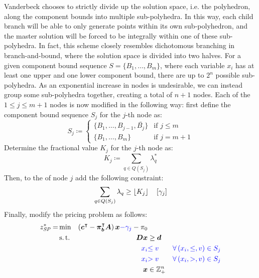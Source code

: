 Vanderbeck chooses to strictly divide up the solution space, i.e. the polyhedron, along the component bounds into multiple sub-polyhedra. In this way, each child branch will be able to only generate points within its own sub-polyhedron, and the master solution will be forced to be integrally within one of these sub-polyhedra. In fact, this scheme closely resembles dichotomous branching in branch-and-bound, where the solution space is divided into two halves. For a given component bound sequence $S = \{B_1, \dots, B_m\}$, where each variable $x_i$ has at least one upper and one lower component bound, there are up to $2^n$ possible sub-polyhedra. As an exponential increase in nodes is undesirable, we can instead group some sub-polyhedra together, creating a total of $n + 1$ nodes. Each of the $1 \leq j \leq m+1$ nodes is now modified in the following way: first define the component bound sequence $S_j$ for the $j$-th node as:
\begin{equation}
S_j \coloneqq
\begin{cases}
\{B_1, \dots, B_{j-1}, \bar{B_j}\} & \text{if } j \leq m \\
\{B_1, \dots, B_m\} & \text{if } j = m+1
\end{cases}
\end{equation}
Determine the fractional value $K_j$ for the $j$-th node as:
\begin{equation}
K_j \coloneqq \sum_{q \in Q(S_j)} \lambda_q^*
\end{equation}
Then, to the \RMP{} of node $j$ add the following constraint:
\begin{equation}
\sum_{q \in Q(S_j)} \lambda_q \geq \lfloor K_j\rfloor \quad \left[\gamma_j\right]
\end{equation}
Finally, modify the pricing problem as follows:
\begin{equation}
\begin{aligned}
z^*_\SP{} = &\min & \left( \vec{c}\transpose - \vec{\pi}_\vec{b}\transpose \mat{A} \right) \vec{x} {\color{blue} - \gamma_j} - \pi_0 & \\
&\st & \mat{D} \vec{x} & \geq \vec{d} \\
&& {\color{blue} x_i} & {\color{blue} \leq v} & {\color{blue} \forall \left( x_i, \leq, v \right) \in S_j} \\
&& {\color{blue} x_i} & {\color{blue} > v} & {\color{blue} \forall \left( x_i, >, v \right) \in S_j} \\
&& \vec{x} & \in \mathbb{Z}_+^n
\end{aligned}
\end{equation}


